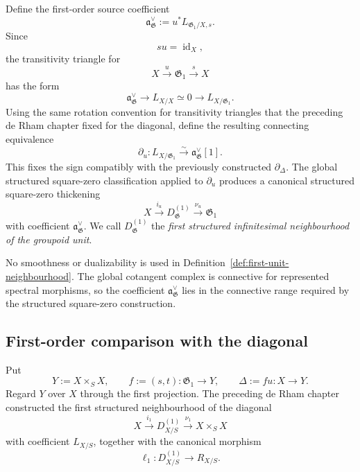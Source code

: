 \begin{definition}
\label{def:first-unit-neighbourhood}
Define the first-order source coefficient
\[
    \mathfrak a_{\mathfrak G}^{\vee}
    :=
    u^*L_{\mathfrak G_1/X,s}.
\]
Since
\[
    s u=\operatorname{id}_X,
\]
the transitivity triangle for
\[
    X\xrightarrow{u}\mathfrak G_1\xrightarrow{s}X
\]
has the form
\[
    \mathfrak a_{\mathfrak G}^{\vee}
    \longrightarrow
    L_{X/X}\simeq0
    \longrightarrow
    L_{X/\mathfrak G_1}.
\]
Using the same rotation convention for transitivity triangles that the
preceding de Rham chapter fixed for the diagonal, define the resulting
connecting equivalence
\[
    \partial_u:
    L_{X/\mathfrak G_1}
    \xrightarrow{\sim}
    \mathfrak a_{\mathfrak G}^{\vee}[1].
\]
This fixes the sign compatibly with the previously constructed
$\partial_\Delta$.
The global structured square-zero classification applied to
$\partial_u$ produces a canonical structured square-zero thickening
\[
    X
    \xrightarrow{i_u}
    D^{(1)}_{\mathfrak G}
    \xrightarrow{\nu_u}
    \mathfrak G_1
\]
with coefficient $\mathfrak a_{\mathfrak G}^{\vee}$.  We call
$D^{(1)}_{\mathfrak G}$ the \emph{first structured infinitesimal
neighbourhood of the groupoid unit}.
\end{definition}

\begin{remark}
No smoothness or dualizability is used in
Definition~\ref{def:first-unit-neighbourhood}.  The global cotangent complex is
connective for represented spectral morphisms, so the coefficient
$\mathfrak a_{\mathfrak G}^{\vee}$ lies in the connective range required by
the structured square-zero construction.
\end{remark}

\subsection{First-order comparison with the diagonal}

Put
\[
    Y:=X\times_SX,
    \qquad
    f:=(s,t):\mathfrak G_1\longrightarrow Y,
    \qquad
    \Delta:=fu:X\longrightarrow Y.
\]
Regard $Y$ over $X$ through the first projection.  The preceding de Rham
chapter constructed the first structured neighbourhood of the diagonal
\[
    X
    \xrightarrow{i_1}
    D^{(1)}_{X/S}
    \xrightarrow{\nu_1}
    X\times_SX
\]
with coefficient $L_{X/S}$, together with the canonical morphism
\[
    \ell_1:
    D^{(1)}_{X/S}
    \longrightarrow
    R_{X/S}.
\]

